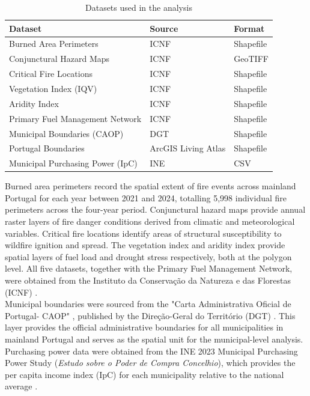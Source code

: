 \begin{table}[h!]
\centering
\caption{Datasets used in the analysis}
\label{tab:datasets}
\begin{tabular}{lll}
\hline
\textbf{Dataset} & \textbf{Source} & \textbf{Format} \\
\hline
Burned Area Perimeters & ICNF\cite{ICNF} & Shapefile \\
Conjunctural Hazard Maps & ICNF\cite{ICNF} & GeoTIFF \\
Critical Fire Locations & ICNF\cite{ICNF} & Shapefile \\
Vegetation Index (IQV) & ICNF\cite{ICNF} & Shapefile \\
Aridity Index & ICNF\cite{ICNF} & Shapefile \\
Primary Fuel Management Network & ICNF\cite{ICNF} & Shapefile \\
Municipal Boundaries (CAOP) & DGT\cite{DGT_CAOP} & Shapefile \\
Portugal Boundaries & ArcGIS Living Atlas\cite{ArcGISLivingAtlas} & Shapefile \\
Municipal Purchasing Power (IpC) & INE\cite{INE_PoderCompra} & CSV \\
\hline
\end{tabular}
\end{table}

Burned area perimeters record the spatial extent of fire events across
mainland Portugal for each year between 2021 and 2024, totalling 5,998
individual fire perimeters across the four-year period. Conjunctural hazard
maps provide annual raster layers of fire danger conditions derived from
climatic and meteorological variables. Critical fire locations identify areas
of structural susceptibility to wildfire ignition and spread. The vegetation
index and aridity index provide spatial layers of fuel load and drought stress
respectively, both at the polygon level. All five datasets, together with the
Primary Fuel Management Network, were obtained from the Instituto da
Conservação da Natureza e das Florestas (ICNF) \cite{ICNF}.\\

Municipal boundaries were sourced from the "Carta Administrativa Oficial de
Portugal- CAOP" , published by the Direção-Geral do Território (DGT)
\cite{DGT_CAOP}. This layer provides the official administrative boundaries
for all municipalities in mainland Portugal and serves as the spatial unit
for the municipal-level analysis.\\

Purchasing power data were obtained from the INE 2023 Municipal Purchasing
Power Study (\textit{Estudo sobre o Poder de Compra Concelhio}), which
provides the per capita income index (IpC) for each municipality relative
to the national average \cite{INE_PoderCompra}.\\


